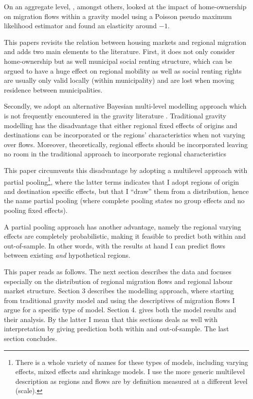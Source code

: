 \documentclass[fleqn,10pt]{SelfArx} %
\begin{document}
        On an aggregate level, \citet{amirault2016drags}, amongst others,
        looked at the impact of home-ownership on migration flows
        within a gravity model using a Poisson pseudo maximum
        likelihood estimator and found an elasticity around
        $-1$. 
        
        This papers revisits the relation between housing markets and regional migration and adds two main elements to the literature. First, it does not only consider home-ownership but as well municipal social renting structure, which can be argued to have a huge effect on regional mobility as well as social renting rights are usually only valid locally (within municipality) and are lost when moving residence between municipalities.
        
        Secondly, we adopt an alternative Bayesian multi-level modelling approach which is not frequently encountered in the gravity literature \citep[a notable exception is][in a trade context]{ranjan2007bayesian}. Traditional gravity modelling has the
        disadvantage that either regional fixed effects of origins and
        destinations can be incorporated or the regions'
        characteristics when not varying over flows. Moreover,
        theoretically, regional effects should be incorporated leaving
        no room in the traditional approach to incorporate regional characteristics

        This paper circumvents this disadvantage by adopting a
        multilevel approach with partial pooling\footnote{There is a
          whole variety of names for these types of models, including
          varying effects, mixed effects and shrinkage models. I use
          the more generic multilevel description as regions and flows
          are by definition measured at a different level (scale).},
        where the latter terms indicates that I adopt regions of
        origin and destination specific effects, but that I ``draw''
        them from a distribution, hence the name partial pooling
        (where complete pooling states no group effects and no pooling
        fixed effects).

        A partial pooling approach has another advantage, namely the
        regional varying effects are completely probabilistic, making
        it feasible to predict both within and out-of-sample. In other
        words, with the results at hand I can predict flows between
        existing \emph{and} hypothetical regions.

        This paper reads as follows. The next section describes the
        data and focuses especially on the distribution of regional
        migration flows and regional labour market structure. Section
        3 describes the modelling approach, where starting from
        traditional gravity model and using the descriptives of
        migration flows I argue for a specific type of model. Section
        4. gives both the model results and their analysis. By the
        latter I mean that this sections deals as well with
        interpretation by giving prediction both within and
        out-of-sample. The last section concludes.
\end{document}
